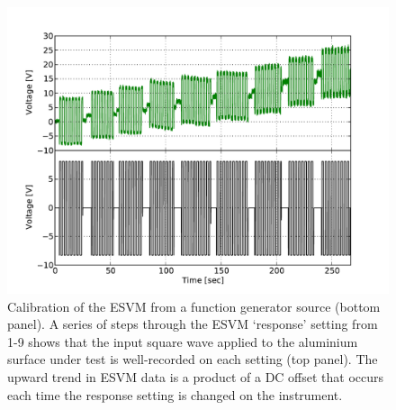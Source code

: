 \begin{figure}
\includegraphics[width=30pc]{chap_electrical/ESVM_Calibration.pdf}
\caption{Calibration of the ESVM from a function generator source (bottom panel).  A series of steps through the ESVM `response' setting from 1-9 shows that the input square wave applied to the aluminium surface under test is well-recorded on each setting (top panel).  The upward trend in ESVM data is a product of a DC offset that occurs each time the response setting is changed on the instrument.}
\label{esvm_calibration}
\end{figure}

\clearpage

